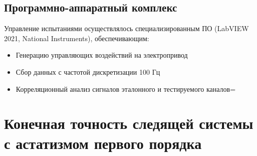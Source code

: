 \subsection{Программно-аппаратный комплекс}
Управление испытаниями осуществлялось специализированным ПО  \newline (LabVIEW 2021, National Instruments), обеспечивающим:
\begin{itemize}
    \item Генерацию управляющих воздействий на электропривод
    \item Сбор данных с частотой дискретизации 100 Гц
    \item Корреляционный анализ сигналов эталонного и тестируемого каналов=
\end{itemize}

\section{Конечная точность следящей системы с астатизмом первого порядка}



